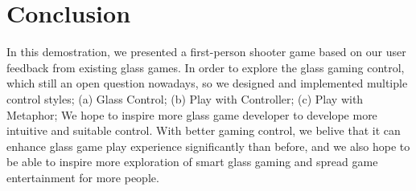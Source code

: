 \documentclass{sigchi}
\begin{document}




\section{Conclusion}
In this demostration, we presented a first-person shooter game based on our user feedback from existing glass games. In order to explore the glass gaming control, which still an open question nowadays, so we designed and implemented multiple control styles; (a) Glass Control; (b) Play with Controller; (c) Play with Metaphor; We hope to inspire more glass game developer to develope more intuitive and suitable control. With better gaming control, we belive that it can enhance glass game play experience significantly than before, and we also hope to be able to inspire more exploration of smart glass gaming and spread game entertainment for more people.
\end{document}
